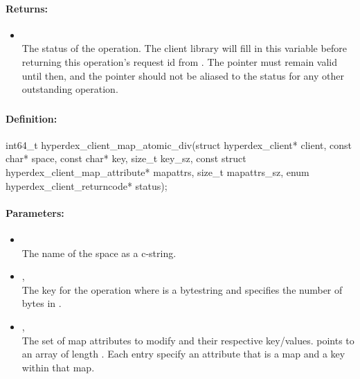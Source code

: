 \paragraph{Returns:}
\begin{itemize}[noitemsep]
\item {}\\
The status of the operation.  The client library will fill in this variable before returning this operation's request id from .  The pointer must remain valid until then, and the pointer should not be aliased to the status for any other outstanding operation.
\end{itemize}

\pagebreak
\subsubsection{}
\label{api:c:map_atomic_div}


\paragraph{Definition:}
\begin{ccode}
int64_t hyperdex_client_map_atomic_div(struct hyperdex_client* client,
        const char* space,
        const char* key, size_t key_sz,
        const struct hyperdex_client_map_attribute* mapattrs, size_t mapattrs_sz,
        enum hyperdex_client_returncode* status);
\end{ccode}

\paragraph{Parameters:}
\begin{itemize}[noitemsep]
\item {}\\
The name of the space as a c-string.
\item {}, \\
The key for the operation where  is a bytestring and  specifies the number of bytes in .
\item {}, \\
The set of map attributes to modify and their respective key/values.   points to an array of length .  Each entry specify an attribute that is a map and a key within that map.
\end{itemize}

